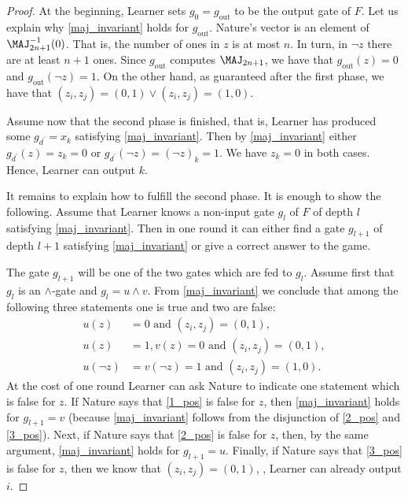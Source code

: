 \begin{proof}
At the beginning, Learner sets $g_0 = g_{\mathrm{out}}$ to be the output gate of $F$. Let us explain why \eqref{maj_invariant} holds for $g_{\mathrm{out}}$. Nature's vector is an element of $\MAJ_{2n + 1}^{-1}(0)$. That is, the number of ones in $z$ is at most $n$. In turn, in $\lnot z$ there are at least  $n + 1$ ones. Since  $g_{\mathrm{out}}$ computes $\MAJ_{2n + 1}$, we have that  $g_{\mathrm{out}}(z) = 0$ and $g_{\mathrm{out}}(\lnot z) = 1$. On the other hand, as %
guaranteed  %
after the first phase, we have that $(z_i, z_j) = (0,1) \lor (z_i,z_j) = (1,0)$.

Assume now that the second phase is finished, that is, Learner has produced some $g_{d^\prime} = x_k$ satisfying \eqref{maj_invariant}. Then by \eqref{maj_invariant} either $g_{d^\prime}(z) = z_k = 0$ or $g_{d^\prime}(\lnot z) = (\lnot z)_k = 1$. We have $z_k = 0$ in both cases. Hence, Learner can output $k$.

It remains to explain how to fulfill the second phase. It is enough to show the following. Assume that Learner knows a non-input gate $g_l$ of $F$ of depth $l$  satisfying \eqref{maj_invariant}. Then in one round it 
%
 can  either find a gate $g_{l + 1}$ of depth $l + 1$ satisfying \eqref{maj_invariant} or give a correct answer to the game.


The gate $g_{l + 1}$ will be one of the two gates which are fed to $g_l$.  Assume first that $g_l$ is an $\land$-gate and $g_l = u \land v$.
  From \eqref{maj_invariant} we conclude that among the following three statements one is true and two are false:
\begin{align}
\label{1_pos}
u(z) &= 0 \mbox{ and } (z_i, z_j) = (0,1), \\
\label{2_pos}
u(z) &= 1, v(z) = 0 \mbox{ and } (z_i, z_j) = (0,1),\\
\label{3_pos}
u(\lnot z) &= v(\lnot z) = 1 \mbox{ and } (z_i,z_j) = (1,0).
\end{align}
At the cost of one round Learner can ask Nature to indicate one 
statement which is false for $z$. %
If Nature says that \eqref{1_pos}
is false for $z$, %
then   \eqref{maj_invariant} holds for $g_{l + 1} = v$ (because \eqref{maj_invariant} follows from the disjunction of \eqref{2_pos} and \eqref{3_pos}). Next, if Nature says that \eqref{2_pos} is false for $z$, then, by the same argument, \eqref{maj_invariant} holds for $g_{l + 1} = u$. Finally, if Nature says that \eqref{3_pos} is false for $z$, then we know that $(z_i, z_j) = (0,1)$, \ie, Learner  can already output $i$.


\end{proof}
